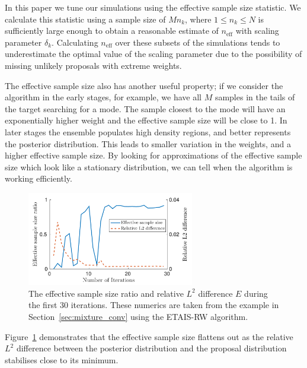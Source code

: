 \documentclass[final]{siamltex}
\newcommand{\neff}{n_{\text{eff}}}
\begin{document}
In this paper we tune our simulations using the effective sample size
statistic. We calculate this statistic using a sample size of $Mn_k$,
where $1 \leq n_k\leq N$ is sufficiently large enough to obtain a
reasonable estimate of $\neff$ with scaling parameter $\delta_k$.
Calculating $\neff$ over these subsets of the simulations tends to
underestimate the optimal value of the scaling parameter due to the
possibility of missing unlikely proposals with extreme weights.

The effective sample size also has another useful property; if we
consider the algorithm in the early stages, for example, we have all
$M$ samples in the tails of the target searching for a mode. The
sample closest to the mode will have an exponentially higher weight
and the effective sample size will be close to 1. In later stages the
ensemble populates high density regions, and better represents the
posterior distribution. This leads to smaller variation in the
weights, and a higher effective sample size. By looking for
approximations of the effective sample size which look like a
stationary distribution, we can tell when the algorithm is working
efficiently.

\begin{figure}[htb]
\centering
\includegraphics[width=0.65\textwidth]{"figures/C1_burnin"}
\caption{The effective sample size ratio and relative $L^2$ difference
$E$ during the first 30 iterations. These numerics are taken from the
example in Section~\ref{sec:mixture_conv} using the ETAIS-RW algorithm.}
\label{fig:neff-burnin}
\end{figure}

Figure~\ref{fig:neff-burnin} demonstrates that the effective sample
size flattens out as the relative $L^2$ difference between the
posterior distribution and the proposal distribution stabilises close
to its minimum.
\end{document}
